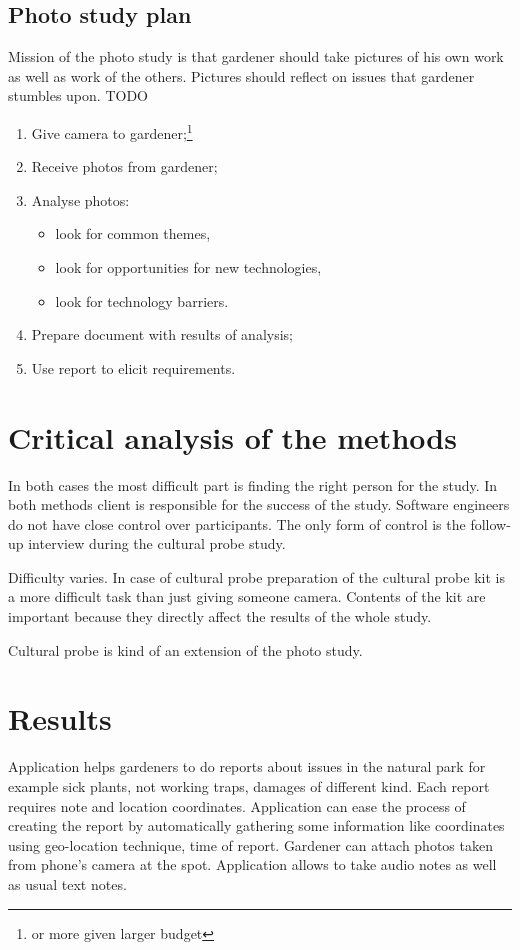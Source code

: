 \documentclass[12pt, a4paper]{article}
\begin{document}
\subsection{Photo study plan}
Mission of the photo study is that gardener should take pictures of his own work as well as work of the others. Pictures should reflect on issues that gardener stumbles upon. TODO
\begin{enumerate}
\item Give camera to gardener;\footnote{or more given larger budget}
\item Receive photos from gardener;
\item Analyse photos:
  \begin{itemize}
    \item look for common themes,
    \item look for opportunities for new technologies,
    \item look for technology barriers.
  \end{itemize} 
 \item Prepare document with results of analysis;
 \item Use report to elicit requirements.
\end{enumerate}

\section{Critical analysis of the methods}

In both cases the most difficult part is finding the right person for the study. In both methods client is responsible for the success of the study. Software engineers do not have close control over participants. The only form of control is the follow-up interview during the cultural probe study. 

Difficulty varies. In case of cultural probe preparation of the cultural probe kit is a more difficult task than just giving someone camera. Contents of the kit are important because they directly affect the results of the whole study. 

Cultural probe is kind of an extension of the photo study.

\section{Results}
Application helps gardeners to do reports about issues in the natural park for example sick plants, not working traps, damages of different kind. Each report requires note and location coordinates. Application can ease the process of creating the report by automatically gathering some information like coordinates using geo-location technique, time of report. Gardener can attach photos taken from phone's camera at the spot. Application allows to take audio notes as well as usual text notes.

\nocite{*}


\end{document}

